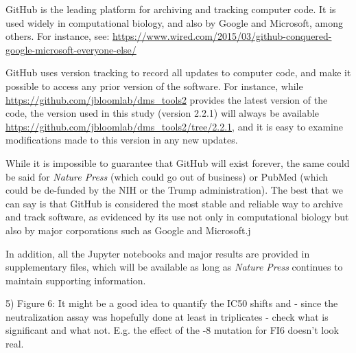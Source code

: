 \documentclass[11pt, oneside]{article}   	%
\begin{document}
{\color{black}
GitHub is the leading platform for archiving and tracking computer code.
It is used widely in computational biology, and also by Google and Microsoft, among others. For instance, see: \url{https://www.wired.com/2015/03/github-conquered-google-microsoft-everyone-else/}

GitHub uses version tracking to record all updates to computer code, and make it possible to access any prior version of the software.
For instance, while \url{https://github.com/jbloomlab/dms_tools2} provides the latest version of the code, the version used in this study (version 2.2.1) will always be available \url{https://github.com/jbloomlab/dms_tools2/tree/2.2.1}, and it is easy to examine modifications made to this version in any new updates.

While it is impossible to guarantee that GitHub will exist forever, the same could be said for \textit{Nature Press} (which could go out of business) or PubMed (which could be de-funded by the NIH or the Trump administration).
The best that we can say is that GitHub is considered the most stable and reliable way to archive and track software, as evidenced by its use not only in computational biology but also by major corporations such as Google and Microsoft.j

In addition, all the Jupyter notebooks and major results are provided in supplementary files, which will be available as long as \textit{Nature Press} continues to maintain supporting information.
}

5) Figure 6: It might be a good idea to quantify the IC50 shifts and - since the neutralization assay was hopefully done at least in triplicates - check what is significant and what not. E.g. the effect of the -8 mutation for FI6 doesn't look real. 
\end{document}
